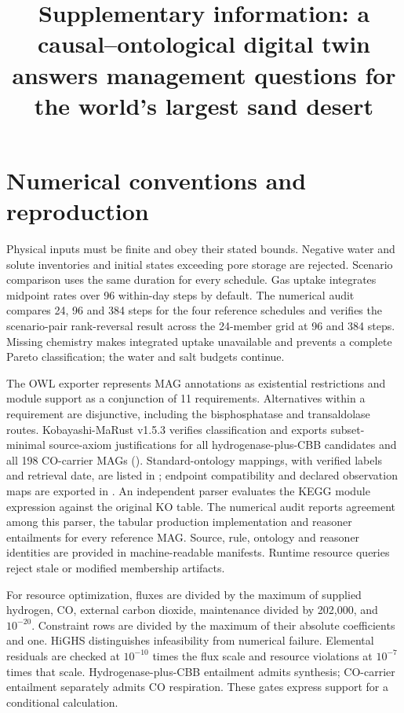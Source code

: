 \documentclass[11pt,a4paper]{article}
\title{Supplementary information: a causal--ontological digital twin answers management questions for the world's largest sand desert}
\date{}
\begin{document}
\maketitle

\setcounter{table}{0}
\section{Numerical conventions and reproduction}\label{sec:reproduction}
Physical inputs must be finite and obey their stated bounds. Negative water and solute inventories and initial states exceeding pore storage are rejected. Scenario comparison uses the same duration for every schedule. Gas uptake integrates midpoint rates over 96 within-day steps by default. The numerical audit compares 24, 96 and 384 steps for the four reference schedules and verifies the scenario-pair rank-reversal result across the 24-member grid at 96 and 384 steps. Missing chemistry makes integrated uptake unavailable and prevents a complete Pareto classification; the water and salt budgets continue.

The OWL exporter represents MAG annotations as existential restrictions and module support as a conjunction of 11 requirements. Alternatives within a requirement are disjunctive, including the bisphosphatase and transaldolase routes. Kobayashi-MaRust v1.5.3 verifies classification and exports subset-minimal source-axiom justifications for all \HtwoCBB{} hydrogenase-plus-CBB candidates and all 198 CO-carrier MAGs (). Standard-ontology mappings, with verified labels and retrieval date, are listed in ; endpoint compatibility and declared observation maps are exported in . An independent parser evaluates the KEGG module expression against the original KO table. The numerical audit reports agreement among this parser, the tabular production implementation and reasoner entailments for every reference MAG. Source, rule, ontology and reasoner identities are provided in machine-readable manifests. Runtime resource queries reject stale or modified membership artifacts.

For resource optimization, fluxes are divided by the maximum of supplied hydrogen, CO, external carbon dioxide, maintenance divided by 202,000, and $10^{-20}$. Constraint rows are divided by the maximum of their absolute coefficients and one. HiGHS distinguishes infeasibility from numerical failure. Elemental residuals are checked at $10^{-10}$ times the flux scale and resource violations at $10^{-7}$ times that scale. Hydrogenase-plus-CBB entailment admits synthesis; CO-carrier entailment separately admits CO respiration. These gates express support for a conditional calculation.
\end{document}
